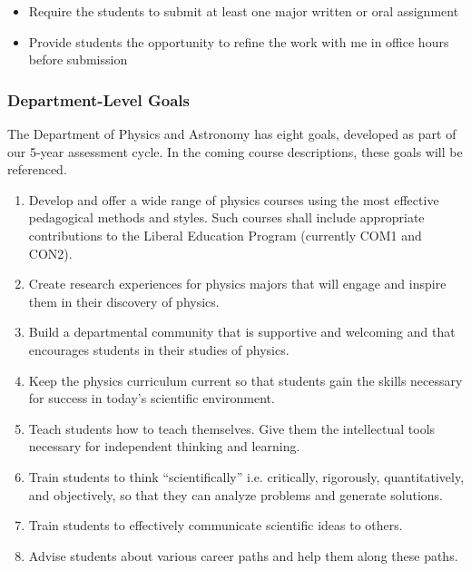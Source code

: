 \documentclass[../../main.tex]{subfiles}
\begin{document}
\begin{enumerate}
\begin{itemize}
\item Require the students to submit at least one major written or oral assignment %
\item Provide students the opportunity to refine the work with me in office hours before submission %
\end{itemize}

\end{enumerate}

\subsubsection{Department-Level Goals}

The Department of Physics and Astronomy has eight goals, developed as part of our 5-year assessment cycle. In the coming course descriptions, these goals will be referenced.

\begin{enumerate}
\item Develop and offer a wide range of physics courses using the most effective pedagogical methods and styles.  Such courses shall include appropriate contributions to the Liberal Education Program (currently COM1 and CON2).
\item Create research experiences for physics majors that will engage and inspire them in their discovery of physics.
\item Build a departmental community that is supportive and welcoming and that encourages students in their studies of physics.
\item Keep the physics curriculum current so that students gain the skills necessary for success in today’s scientific environment.
\item Teach students how to teach themselves. Give them the intellectual tools necessary for independent thinking and learning.
\item Train students to think ``scientifically'' i.e. critically, rigorously, quantitatively, and objectively, so that they can analyze problems and generate solutions.
\item Train students to effectively communicate scientific ideas to others.
\item Advise students about various career paths and help them along these paths.
\end{enumerate}
\end{document}
